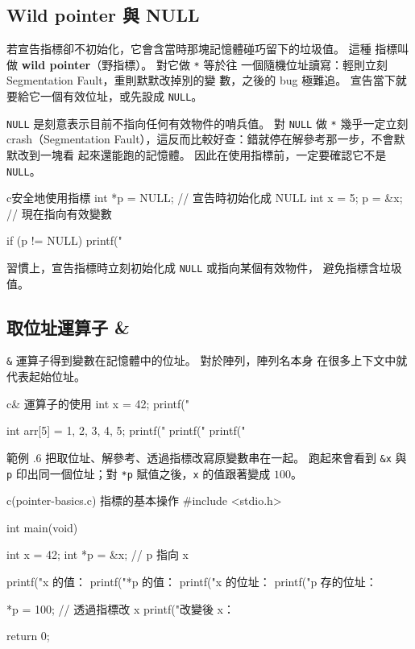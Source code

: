 \subsection{Wild pointer 與 NULL}

若宣告指標卻不初始化，它會含當時那塊記憶體碰巧留下的垃圾值。 這種
指標叫做 \textbf{wild pointer}（野指標）。 對它做 \texttt{*} 等於往
一個隨機位址讀寫：輕則立刻 Segmentation Fault，重則默默改掉別的變
數，之後的 bug 極難追。 宣告當下就要給它一個有效位址，或先設成
\texttt{NULL}。

\texttt{NULL} 是刻意表示目前不指向任何有效物件的哨兵值。 對
\texttt{NULL} 做 \texttt{*} 幾乎一定立刻 crash（Segmentation
Fault），這反而比較好查：錯就停在解參考那一步，不會默默改到一塊看
起來還能跑的記憶體。 因此在使用指標前，一定要確認它不是
\texttt{NULL}。

\begin{code}{c}{安全地使用指標}
int *p = NULL;           // 宣告時初始化成 NULL
int x = 5;
p = &x;                  // 現在指向有效變數

if (p != NULL) {
    printf("%
}
\end{code}

習慣上，宣告指標時立刻初始化成 \texttt{NULL} 或指向某個有效物件，
避免指標含垃圾值。

\subsection{取位址運算子 \&}

\texttt{\&} 運算子得到變數在記憶體中的位址。 對於陣列，陣列名本身
在很多上下文中就代表起始位址。

\begin{code}{c}{\& 運算子的使用}
int x = 42;
printf("%

int arr[5] = {1, 2, 3, 4, 5};
printf("%
printf("%
printf("%
\end{code}

範例 \thechapter.6 把取位址、解參考、透過指標改寫原變數串在一起。
跑起來會看到 \texttt{\&x} 與 \texttt{p} 印出同一個位址；對
\texttt{*p} 賦值之後，\texttt{x} 的值跟著變成 $100$。

\begin{example}{c}{(pointer-basics.c) 指標的基本操作}
#include <stdio.h>

int main(void) {
    int x = 42;
    int *p = &x;           // p 指向 x

    printf("x 的值：%
    printf("*p 的值：%
    printf("x 的位址：%
    printf("p 存的位址：%

    *p = 100;              // 透過指標改 x
    printf("改變後 x：%

    return 0;
}
\end{example}

